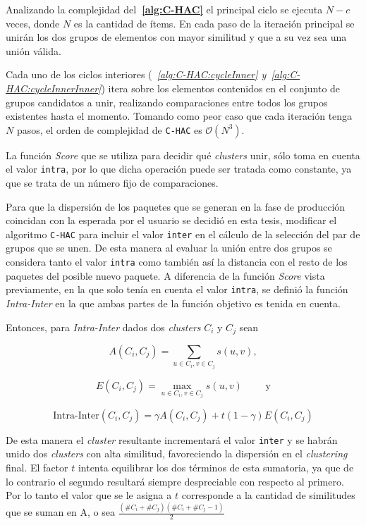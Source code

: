 Analizando la complejidad del\textbf{~\autoref{alg:C-HAC}} el principal ciclo se ejecuta $N - c$ veces, donde $N$ es la cantidad de ítems. En cada paso de la iteración principal se unirán los dos grupos de elementos con mayor similitud y que a su vez sea una unión válida. 

Cada uno de los ciclos interiores (\textit{~\autoref{alg:C-HAC:cycleInner} y~\autoref{alg:C-HAC:cycleInnerInner}}) itera sobre los elementos contenidos en el conjunto de grupos candidatos a unir, realizando comparaciones entre todos los grupos existentes hasta el momento. Tomando como peor caso que cada iteración tenga $N$ pasos, el orden de complejidad de \texttt{C-HAC} es $\mathcal{O}(N^{3})$. 

La función \textit{Score} que se utiliza para decidir qué {\em clusters} unir, sólo toma en cuenta el valor \texttt{intra}, por lo que dicha operación puede ser tratada como constante, ya que se trata de un número fijo de comparaciones.

Para que la dispersión de los paquetes que se generan en la fase de producción coincidan con la esperada por el usuario se decidió en esta tesis, modificar el algoritmo \texttt{C-HAC} para incluir el valor \texttt{inter} en el cálculo de la selección del par de grupos que se unen. De esta manera al evaluar la unión entre dos grupos se considera tanto el valor \texttt{intra} como también así la distancia con el resto de los paquetes del posible nuevo paquete. A diferencia de la función \textit{Score} vista previamente, en la que solo tenía en cuenta el valor \texttt{intra}, se definió la función \textit{Intra-Inter} en la que ambas partes de la función objetivo es tenida en cuenta. 

Entonces, para \textit{Intra-Inter} dados dos {\em clusters} $C_i$ y $C_j$ sean

$$A(C_i,C_j) = \sum_{u \in C_i, v \in C_j}{s(u,v)},$$

$$E(C_i,C_j)=\max_{u \in C_i, v \in C_j}{s(u,v)} \qquad \mbox{ y}$$

$$\mbox{Intra-Inter}(C_i,C_j) = \gamma A(C_i,C_j) + t (1-\gamma) E(C_i,C_j)$$

De esta manera el {\em cluster} resultante incrementará el valor \texttt{inter} y se habrán unido dos {\em clusters} con alta similitud, favoreciendo la dispersión en el {\em clustering} final. El factor $t$ intenta equilibrar los dos términos de esta sumatoria, ya que de lo contrario el segundo resultará siempre despreciable con respecto al primero. Por lo tanto el valor que se le asigna a $t$ corresponde a la cantidad de similitudes que se suman en A, o sea $\frac{(\#C_i + \#C_j) (\#C_i + \#C_j - 1)}{2}$  


